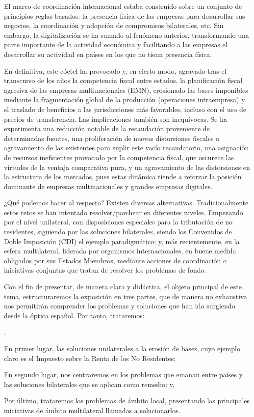 \documentclass[10pt,a4paper]{article}
\newcounter{numitem}
\newenvironment{lnum}
      {\begin{list}{\arabic{numitem}.}{%
          \usecounter{numitem}%
          \setlength{\leftmargin}{1cm}%
          \setlength{\parskip}{3pt}%
          \setlength{\itemsep}{0pt}%
          \setlength{\parsep}{0pt}%
      }}
      {\end{list}}
\begin{document}
El marco de coordinación internacional estaba construido sobre un conjunto de principios reglas basados: la presencia física de las empresas para desarrollar sus negocios, la coordinación y adopción de compromisos bilaterales, etc. Sin embargo, la digitalización se ha sumado al fenómeno anterior, transformando una parte importante de la actividad económica y facilitando a las empresas el desarrollar su actividad en países en los que no tienn presencia física. 

En definitiva, este cóctel ha provocado y, en cierto modo, agravado tras el transcurso de los años la competencia fiscal entre estados, la planificación fiscal agresiva de las empresas multinacionales (EMN), erosionado las bases imponibles mediante la fragmentación global de la producción (operaciones intraempresa) y el traslado de beneficios a las jurisdicciones más favorables, incluso con el uso de precios de transferencia. Las implicaciones también son inequívocas. Se ha experimenta una reducción notable de la recaudación proveniente de determinadas fuentes, una proliferación de nuevas distorsiones fiscales o agravamiento de las existentes para suplir este vacío recaudatorio, una asignación de recursos ineficientes provocado por la competencia fiscal, que oscurece las virtudes de la ventaja comparativa pura, y un agravamiento de las distorsiones en la estructura de los mercados, pues estas dinámica tiende a reforzar la posición dominante de empresas multinacionales y grandes empresas digitales.

¿Qué podemos hacer al respecto? Existen diversas alternativas. Tradicionalmente estos retos se han intentado resolver/parchear en diferentes niveles. Empezando por el nivel unilateral, con disposiciones especiales para la tributación de no residentes, siguiendo por las soluciones bilaterales, siendo los Convenidos de Doble Imposición (CDI) el ejemplo paradigmático; y, más recientemente, en la esfera multilateral, liderada por organismos internacionales, en buene medida obligados por sus Estados Miembros, mediante acciones de coordinación o iniciativas conjuntas que tratan de resolver los problemas de fondo.

Con el fin de presentar, de manera clara y didáctica, el objeto principal de este tema, estructuraremos la exposición en tres partes, que de manera no exhaustiva nos permitirán comprender los problemas y soluciones que han ido surgiendo desde la óptica español. Por tanto, trataremos:
\begin{lnum}
    \item En primer lugar, las soluciones unilaterales a la erosión de bases, cuyo ejemplo claro es el Impuesto sobre la Renta de los No Residentes;
    \item En segundo lugar, nos centraremos en los problemas que emanan entre países y las soluciones bilaterales que se aplican como remedio; y,
    \item Por último, trataremos los problemas de ámbito local, presentando las principales iniciativas de ámbito multilateral llamadas a solucionarlos. 
\end{lnum}
\end{document}
